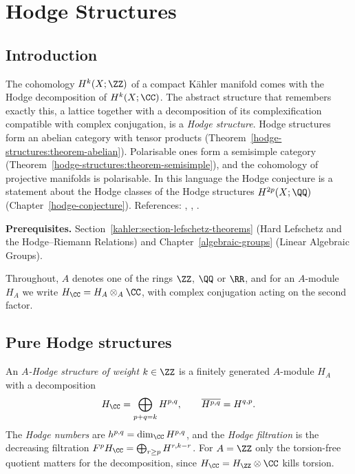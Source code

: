 \chapter{Hodge Structures}\label{hodge-structures}

\section{Introduction}\label{hodge-structures:section-introduction}

The cohomology $H^k(X; \ZZ)$ of a compact K\"ahler manifold comes with the Hodge decomposition of $H^k(X; \CC)$. The abstract structure that remembers
exactly this, a lattice together with a decomposition of its complexification compatible with complex conjugation, is a \emph{Hodge structure}. Hodge
structures form an abelian category with tensor products (Theorem~\ref{hodge-structures:theorem-abelian}). Polarisable ones form a semisimple category
(Theorem~\ref{hodge-structures:theorem-semisimple}), and the cohomology of projective manifolds is polarisable. In this language the Hodge conjecture is a statement
about the Hodge classes of the Hodge structures $H^{2p}(X; \QQ)$ (Chapter~\ref{hodge-conjecture}). References: \cite[Chapter 7]{voisin-hodge-1}, \cite{deligne-hodge-2},
\cite[Chapter 2]{peters-steenbrink}.

\noindent\textbf{Prerequisites.} Section~\ref{kahler:section-lefschetz-theorems} (Hard Lefschetz and the Hodge--Riemann Relations) and Chapter~\ref{algebraic-groups} (Linear Algebraic
Groups).

Throughout, $A$ denotes one of the rings $\ZZ$, $\QQ$ or $\RR$, and for an $A$-module $H_A$ we write $H_\CC = H_A \otimes_A\CC$, with complex conjugation acting on the second
factor.

\section{Pure Hodge structures}\label{hodge-structures:section-definition}

\begin{definition}\label{hodge-structures:definition-hodge-structure}
An \emph{$A$-Hodge structure of weight $k \in \ZZ$} is a finitely generated $A$-module $H_A$ with a decomposition
\[
H_\CC = \bigoplus_{p+q=k}H^{p,q}, \qquad \overline{H^{p,q}} = H^{q,p}.
\]
The \emph{Hodge numbers} are $h^{p,q} = \dim_\CC H^{p,q}$, and the \emph{Hodge filtration} is the decreasing filtration $F^pH_\CC = \bigoplus_{r \geq p}H^{r,k-r}$. For $A = \ZZ$ only the
torsion-free quotient matters for the decomposition, since $H_\CC = H_\ZZ \otimes \CC$ kills torsion.
\end{definition}

